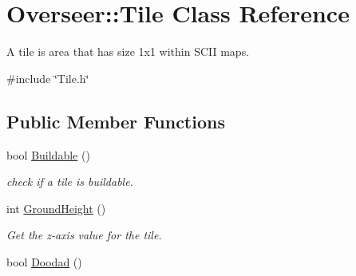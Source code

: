\hypertarget{classOverseer_1_1Tile}{}\section{Overseer\+:\+:Tile Class Reference}
\label{classOverseer_1_1Tile}


A tile is area that has size 1x1 within S\+C\+II maps.  




{\ttfamily \#include \char`\"{}Tile.\+h\char`\"{}}

\subsection*{Public Member Functions}
\begin{DoxyCompactItemize}
\item 
bool \hyperlink{classOverseer_1_1Tile_a51ec17d30cfc6d3d880799b97cbf5c8d}{Buildable} ()
\begin{DoxyCompactList}\small\item\em check if a tile is buildable. \end{DoxyCompactList}\item 
int \hyperlink{classOverseer_1_1Tile_a7a507e706adf690a78a0f48e7e347905}{Ground\+Height} ()
\begin{DoxyCompactList}\small\item\em Get the z-\/axis value for the tile. \end{DoxyCompactList}\item 
bool \hyperlink{classOverseer_1_1Tile_ad9468aec8d793d65e8c29ef7637f2e55}{Doodad} ()\hypertarget{classOverseer_1_1Tile_ad9468aec8d793d65e8c29ef7637f2e55}{}\label{classOverseer_1_1Tile_ad9468aec8d793d65e8c29ef7637f2e55}


\end{DoxyCompactItemize}

